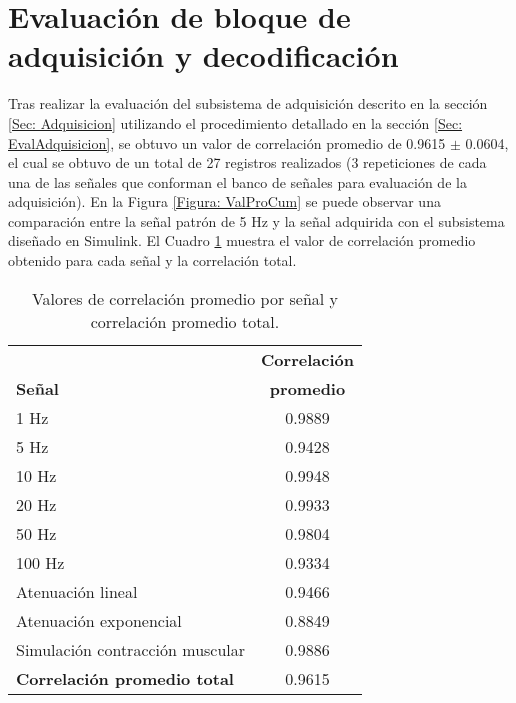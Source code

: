 
\section{Evaluación de bloque de adquisición y decodificación}
Tras realizar la evaluación del subsistema de adquisición descrito en la sección \ref{Sec: Adquisicion} utilizando el procedimiento detallado en la sección \ref{Sec: EvalAdquisicion}, se obtuvo un valor de correlación promedio de 0.9615 $\pm$ 0.0604, el cual se obtuvo de un total de 27 registros realizados (3 repeticiones de cada una de las señales que conforman el banco de señales para evaluación de la adquisición). En la Figura \ref{Figura: ValProCum} se puede observar una comparación entre la señal patrón de 5 Hz y la señal adquirida con el subsistema diseñado en Simulink\textregistered. El Cuadro \ref{Cuadro:ValoresCorre} muestra el valor de correlación promedio obtenido para cada señal y la correlación total.

\begin{table}[htbp]
	\centering
	\begin{tabular}{|l|c|}
	\hline
	\textbf{} & \textbf{Correlación}\\ 
	\textbf{Señal} & \textbf{promedio}\\ \hline	\hline
	1 Hz & 0.9889\\ \hline
	5 Hz & 0.9428\\ \hline
	10 Hz & 0.9948\\ \hline
	20 Hz & 0.9933\\ \hline
	50 Hz & 0.9804\\ \hline
	100 Hz & 0.9334\\ \hline
	Atenuación lineal & 0.9466\\ \hline
	Atenuación exponencial & 0.8849\\ \hline
	Simulación contracción muscular & 0.9886\\ \hline
	\textbf{Correlación promedio total} & 0.9615\\ \hline
	\end{tabular}
	\caption{Valores de correlación promedio por señal y correlación promedio total.}
	\label{Cuadro:ValoresCorre}
\end{table}


